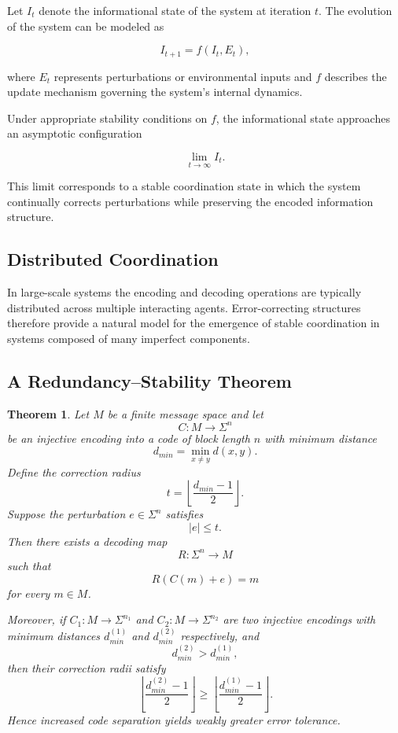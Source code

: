 \documentclass[12pt]{article}
\begin{document}
Let $I_t$ denote the informational state of the system at iteration $t$. The evolution of the system can be modeled as

\[
I_{t+1} = f(I_t , E_t),
\]

where $E_t$ represents perturbations or environmental inputs and $f$ describes the update mechanism governing the system's internal dynamics.

Under appropriate stability conditions on $f$, the informational state approaches an asymptotic configuration

\[
\lim_{t \to \infty} I_t .
\]

This limit corresponds to a stable coordination state in which the system continually corrects perturbations while preserving the encoded information structure.

\subsection{Distributed Coordination}

In large-scale systems the encoding and decoding operations are typically distributed across multiple interacting agents. Error-correcting structures therefore provide a natural model for the emergence of stable coordination in systems composed of many imperfect components.

\subsection{A Redundancy--Stability Theorem}

\newtheorem{theorem}{Theorem}
\newtheorem{corollary}{Corollary}

\begin{theorem}
Let $M$ be a finite message space and let
\[
C : M \rightarrow \Sigma^n
\]
be an injective encoding into a code of block length $n$ with minimum distance
\[
d_{min} = \min_{x \neq y} d(x,y) .
\]
Define the correction radius
\[
t = \left\lfloor \frac{d_{min}-1}{2} \right\rfloor .
\]
Suppose the perturbation $e \in \Sigma^n$ satisfies
\[
|e| \le t .
\]
Then there exists a decoding map
\[
R : \Sigma^n \rightarrow M
\]
such that
\[
R(C(m)+e)=m
\]
for every $m \in M$.

Moreover, if $C_1 : M \to \Sigma^{n_1}$ and $C_2 : M \to \Sigma^{n_2}$ are two injective encodings with minimum distances $d_{min}^{(1)}$ and $d_{min}^{(2)}$ respectively, and
\[
d_{min}^{(2)} > d_{min}^{(1)} ,
\]
then their correction radii satisfy
\[
\left\lfloor \frac{d_{min}^{(2)}-1}{2} \right\rfloor
\ge
\left\lfloor \frac{d_{min}^{(1)}-1}{2} \right\rfloor .
\]
Hence increased code separation yields weakly greater error tolerance.
\end{theorem}
\end{document}
